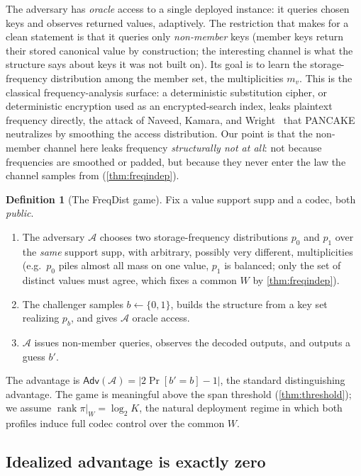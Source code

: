 \documentclass[11pt]{article}
\theoremstyle{definition}
\newtheorem{definition}{Definition}[section]
\theoremstyle{plain}
\theoremstyle{remark}
\DeclareMathOperator{\rank}{rank}
\newcommand{\W}{W}                          %
\newcommand{\proj}{\pi}                     %
\newcommand{\supp}{\mathrm{supp}}           %
\newcommand{\Adv}{\mathsf{Adv}}             %
\begin{document}
The adversary has \emph{oracle} access to a single deployed instance: it queries chosen
keys and observes returned values, adaptively. The restriction that makes for a clean
statement is that it queries only \emph{non-member} keys (member keys return their stored
canonical value by construction; the interesting channel is what the structure says about
keys it was not built on). Its goal is to learn the storage-frequency distribution among
the member set, the multiplicities $m_v$. This is the classical frequency-analysis
surface: a deterministic substitution cipher, or deterministic encryption used as an
encrypted-search index, leaks plaintext frequency directly, the attack of Naveed, Kamara,
and Wright~\cite{naveed2015inference} that PANCAKE~\cite{grubbs2020pancake} neutralizes
by smoothing the access distribution. Our point is that the non-member channel here leaks
frequency \emph{structurally not at all}: not because frequencies are smoothed or padded,
but because they never enter the law the channel samples from (\cref{thm:freqindep}).

\begin{definition}[The FreqDist game]
\label{def:freqdist}
Fix a value support $\supp$ and a codec, both \emph{public}.
\begin{enumerate}
  \item The adversary $\mathcal{A}$ chooses two storage-frequency distributions $p_0$
  and $p_1$ over the \emph{same} support $\supp$, with arbitrary, possibly very
  different, multiplicities (e.g.\ $p_0$ piles almost all mass on one value, $p_1$ is
  balanced; only the set of distinct values must agree, which fixes a common $\W$ by
  \cref{thm:freqindep}).
  \item The challenger samples $b \leftarrow \{0,1\}$, builds the structure from a key
  set realizing $p_b$, and gives $\mathcal{A}$ oracle access.
  \item $\mathcal{A}$ issues non-member queries, observes the decoded outputs, and outputs
  a guess $b'$.
\end{enumerate}
The advantage is $\Adv(\mathcal{A}) = |2\Pr[b' = b] - 1|$, the standard distinguishing
advantage. The game is meaningful above the span threshold (\cref{thm:threshold}); we
assume $\rank \proj|_{\W} = \log_2 K$, the natural deployment regime in which both
profiles induce full codec control over the common $\W$.
\end{definition}

\subsection{Idealized advantage is exactly zero}
\end{document}
